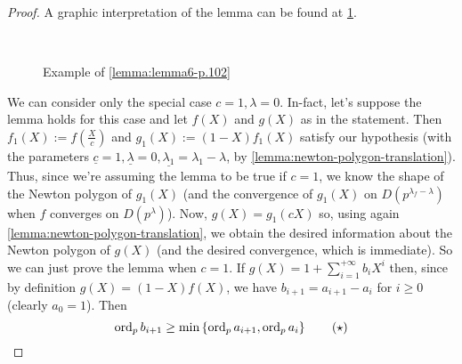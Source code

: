 		\begin{proof}
			A graphic interpretation of the lemma can be found at \cref{figure:figure4.6}.
			\begin{figure}
				\centering
				 \qquad \qquad {} \\
				 \qquad \qquad
				\caption{Example of \protect\cref{lemma:lemma6-p.102}}
				\label{figure:figure4.6}
			\end{figure}
			We can consider only the special case $c=1, \lambda = 0$. In-fact, let's suppose the lemma holds for this case and let $f(X)$ and $g(X)$ as in the statement. Then $f_1(X) := f\left(\tfrac{X}{c}\right)$ and $g_1(X) := (1 - X)f_1(X)$ satisfy our hypothesis (with the parameters $\underline{c}=1, \underline{\lambda} = 0, \underline{\lambda_1} = \lambda_1 - \lambda$, by \cref{lemma:newton-polygon-translation}). Thus, since we're assuming the lemma to be true if $c=1$, we know the shape of the Newton polygon of $g_1(X)$ (and the convergence of $g_1(X)$ on $D(p^{\lambda_f - \lambda})$ when $f$ converges on $D(p^{\lambda})$). Now, $g(X) = g_1(cX)$ so,  using again \cref{lemma:newton-polygon-translation}, we obtain the desired information about the Newton polygon of $g(X)$ (and the desired convergence, which is immediate). So we can just prove the lemma when $c = 1$.\newline
			If $g(X) = 1 + \sum_{i=1}^{+\infty} b_iX^i$ then, since by definition $g(X) = (1 - X)f(X)$, we have $b_{i+1} = a_{i+1} - a_i$ for $i \geq 0$ (clearly $a_0 = 1$). Then
			\begin{equation*}
				\textrm{ord}_p\, b_{i+1} \geq \min\left\{\textrm{ord}_p\, a_{i+1}, \textrm{ord}_p\, a_i \right\} \tag{$\star$}
			\end{equation*}

\end{proof}
